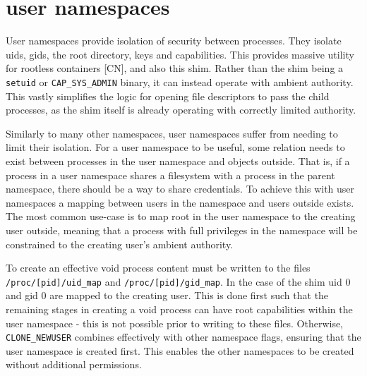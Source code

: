 \documentclass[12pt,a4paper,twoside]{report}
\begin{document}
\section{user namespaces}
\label{sec:voiding-user}

User namespaces provide isolation of security between processes. They isolate uids, gids, the root directory, keys and capabilities. This provides massive utility for rootless containers [CN], and also this shim. Rather than the shim being a \texttt{setuid} or \texttt{CAP\_SYS\_ADMIN} binary, it can instead operate with ambient authority. This vastly simplifies the logic for opening file descriptors to pass the child processes, as the shim itself is already operating with correctly limited authority.

Similarly to many other namespaces, user namespaces suffer from needing to limit their isolation. For a user namespace to be useful, some relation needs to exist between processes in the user namespace and objects outside. That is, if a process in a user namespace shares a filesystem with a process in the parent namespace, there should be a way to share credentials. To achieve this with user namespaces a mapping between users in the namespace and users outside exists. The most common use-case is to map root in the user namespace to the creating user outside, meaning that a process with full privileges in the namespace will be constrained to the creating user's ambient authority.

To create an effective void process content must be written to the files \texttt{/proc/[pid]/uid\_map} and \texttt{/proc/[pid]/gid\_map}. In the case of the shim uid 0 and gid 0 are mapped to the creating user. This is done first such that the remaining stages in creating a void process can have root capabilities within the user namespace - this is not possible prior to writing to these files. Otherwise, \texttt{CLONE\_NEWUSER} combines effectively with other namespace flags, ensuring that the user namespace is created first. This enables the other namespaces to be created without additional permissions.
\end{document}
